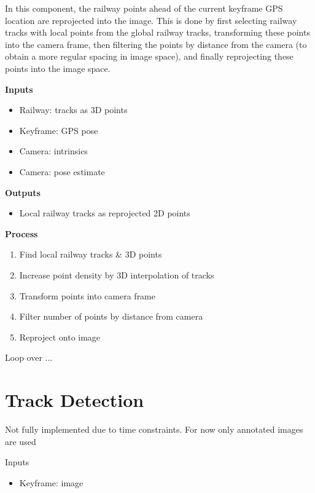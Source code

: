 In this component, the railway points ahead of the current keyframe GPS location are reprojected into the image. This is done by first selecting railway tracks with local points from the global railway tracks, transforming these points into the camera frame, then filtering the points by distance from the camera (to obtain a more regular spacing in image space), and finally reprojecting these points into the image space.

\begin{multicols}{2}
    \textbf{Inputs}
    \begin{itemize}
        \item Railway: tracks as 3D points
        \item Keyframe: GPS pose
        \item Camera: intrinsics
        \item Camera: pose estimate
    \end{itemize}
    
    \textbf{Outputs}
    \begin{itemize}
      \item Local railway tracks as reprojected 2D points
    \end{itemize}

    \vfill\null
    \columnbreak

    \textbf{Process}
    \begin{enumerate}
        \item Find local railway tracks \& 3D points
        \item Increase point density by 3D interpolation of tracks
        \item Transform points into camera frame
        \item Filter number of points by distance from camera
        \item Reproject onto image
    \end{enumerate}
\end{multicols}

Loop over ...


\section{Track Detection}
\label{sec:track_detection}

Not fully implemented due to time constraints. For now only annotated images are used

Inputs
\begin{itemize}
    \item Keyframe: image
\end{itemize}

